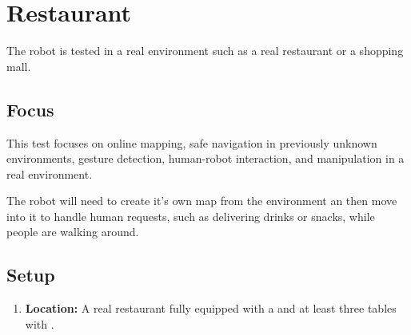 \section{Restaurant}
The robot is tested in a real environment such as a real restaurant or a shopping mall.

\subsection{Focus}
This test focuses on online mapping, safe navigation in previously unknown environments, gesture detection, human-robot interaction, and manipulation in a real environment.

The robot will need to create it's own map from the environment an then move into it to handle human requests, such as delivering drinks or snacks, while people are walking around.

\subsection{Setup}
\begin{enumerate}
\item \textbf{Location:} A real restaurant fully equipped with a  and at least three tables with . 
\end{enumerate}

